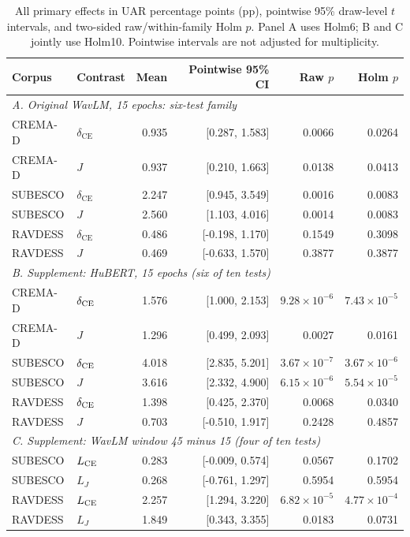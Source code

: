 \documentclass[letterpaper]{article}
\begin{document}
\begin{table}[t]
\centering\small
\caption{All primary effects in UAR percentage points (pp), pointwise 95\% draw-level $t$ intervals, and two-sided raw/within-family Holm $p$. Panel A uses Holm6; B and C jointly use Holm10. Pointwise intervals are not adjusted for multiplicity.}
\label{tab:primary}
\setlength{\tabcolsep}{5pt}
\begin{tabular}{llrrrr}\toprule
Corpus & Contrast & Mean & Pointwise 95\% CI & Raw $p$ & Holm $p$\\\midrule
\multicolumn{6}{l}{\textit{A. Original WavLM, 15 epochs: six-test family}}\\
CREMA-D & $\delta_{\mathrm{CE}}$ & 0.935 & [0.287, 1.583] & 0.0066 & 0.0264\\
CREMA-D & $J$ & 0.937 & [0.210, 1.663] & 0.0138 & 0.0413\\
SUBESCO & $\delta_{\mathrm{CE}}$ & 2.247 & [0.945, 3.549] & 0.0016 & 0.0083\\
SUBESCO & $J$ & 2.560 & [1.103, 4.016] & 0.0014 & 0.0083\\
RAVDESS & $\delta_{\mathrm{CE}}$ & 0.486 & [-0.198, 1.170] & 0.1549 & 0.3098\\
RAVDESS & $J$ & 0.469 & [-0.633, 1.570] & 0.3877 & 0.3877\\\midrule
\multicolumn{6}{l}{\textit{B. Supplement: HuBERT, 15 epochs (six of ten tests)}}\\
CREMA-D & $\delta_{\rm CE}$ & 1.576 & [1.000, 2.153] & $9.28\!\times\!10^{-6}$ & $7.43\!\times\!10^{-5}$\\
CREMA-D & $J$ & 1.296 & [0.499, 2.093] & 0.0027 & 0.0161\\
SUBESCO & $\delta_{\rm CE}$ & 4.018 & [2.835, 5.201] & $3.67\!\times\!10^{-7}$ & $3.67\!\times\!10^{-6}$\\
SUBESCO & $J$ & 3.616 & [2.332, 4.900] & $6.15\!\times\!10^{-6}$ & $5.54\!\times\!10^{-5}$\\
RAVDESS & $\delta_{\rm CE}$ & 1.398 & [0.425, 2.370] & 0.0068 & 0.0340\\
RAVDESS & $J$ & 0.703 & [-0.510, 1.917] & 0.2428 & 0.4857\\
\midrule
\multicolumn{6}{l}{\textit{C. Supplement: WavLM window 45 minus 15 (four of ten tests)}}\\
SUBESCO & $L_{\rm CE}$ & 0.283 & [-0.009, 0.574] & 0.0567 & 0.1702\\
SUBESCO & $L_J$ & 0.268 & [-0.761, 1.297] & 0.5954 & 0.5954\\
RAVDESS & $L_{\rm CE}$ & 2.257 & [1.294, 3.220] & $6.82\!\times\!10^{-5}$ & $4.77\!\times\!10^{-4}$\\
RAVDESS & $L_J$ & 1.849 & [0.343, 3.355] & 0.0183 & 0.0731\\
\bottomrule
\end{tabular}
\end{table}
\end{document}
